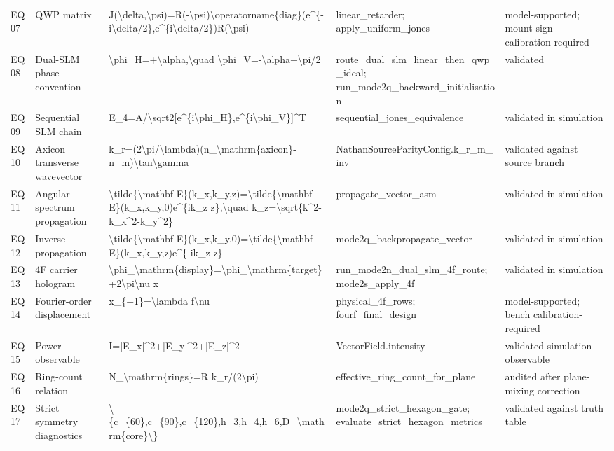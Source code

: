 \documentclass[11pt,a4paper]{report}
\begin{document}
\begin{longtable}{p{}p{}p{}p{}p{}}
EQ07 & QWP matrix & J(\textbackslash{}delta,\textbackslash{}psi)=R(-\textbackslash{}psi)\textbackslash{}operatorname\{diag\}(e\textasciicircum{}\{-i\textbackslash{}delta/2\},e\textasciicircum{}\{i\textbackslash{}delta/2\})R(\textbackslash{}psi) & linear\_retarder; apply\_uniform\_jones & model-supported; mount sign calibration-required\\
EQ08 & Dual-SLM phase convention & \textbackslash{}phi\_H=+\textbackslash{}alpha,\textbackslash{}quad \textbackslash{}phi\_V=-\textbackslash{}alpha+\textbackslash{}pi/2 & route\_dual\_slm\_linear\_then\_qwp\_ideal; run\_mode2q\_backward\_initialisation & validated\\
EQ09 & Sequential SLM chain & E\_4=A/\textbackslash{}sqrt2[e\textasciicircum{}\{i\textbackslash{}phi\_H\},e\textasciicircum{}\{i\textbackslash{}phi\_V\}]\textasciicircum{}T & sequential\_jones\_equivalence & validated in simulation\\
EQ10 & Axicon transverse wavevector & k\_r=(2\textbackslash{}pi/\textbackslash{}lambda)(n\_\textbackslash{}mathrm\{axicon\}-n\_m)\textbackslash{}tan\textbackslash{}gamma & NathanSourceParityConfig.k\_r\_m\_inv & validated against source branch\\
EQ11 & Angular spectrum propagation & \textbackslash{}tilde\{\textbackslash{}mathbf E\}(k\_x,k\_y,z)=\textbackslash{}tilde\{\textbackslash{}mathbf E\}(k\_x,k\_y,0)e\textasciicircum{}\{ik\_z z\},\textbackslash{}quad k\_z=\textbackslash{}sqrt\{k\textasciicircum{}2-k\_x\textasciicircum{}2-k\_y\textasciicircum{}2\} & propagate\_vector\_asm & validated in simulation\\
EQ12 & Inverse propagation & \textbackslash{}tilde\{\textbackslash{}mathbf E\}(k\_x,k\_y,0)=\textbackslash{}tilde\{\textbackslash{}mathbf E\}(k\_x,k\_y,z)e\textasciicircum{}\{-ik\_z z\} & mode2q\_backpropagate\_vector & validated in simulation\\
EQ13 & 4F carrier hologram & \textbackslash{}phi\_\textbackslash{}mathrm\{display\}=\textbackslash{}phi\_\textbackslash{}mathrm\{target\}+2\textbackslash{}pi\textbackslash{}nu x & run\_mode2n\_dual\_slm\_4f\_route; mode2s\_apply\_4f & validated in simulation\\
EQ14 & Fourier-order displacement & x\_\{+1\}=\textbackslash{}lambda f\textbackslash{}nu & physical\_4f\_rows; fourf\_final\_design & model-supported; bench calibration-required\\
EQ15 & Power observable & I=|E\_x|\textasciicircum{}2+|E\_y|\textasciicircum{}2+|E\_z|\textasciicircum{}2 & VectorField.intensity & validated simulation observable\\
EQ16 & Ring-count relation & N\_\textbackslash{}mathrm\{rings\}=R k\_r/(2\textbackslash{}pi) & effective\_ring\_count\_for\_plane & audited after plane-mixing correction\\
EQ17 & Strict symmetry diagnostics & \textbackslash{}\{c\_\{60\},c\_\{90\},c\_\{120\},h\_3,h\_4,h\_6,D\_\textbackslash{}mathrm\{core\}\textbackslash{}\} & mode2q\_strict\_hexagon\_gate; evaluate\_strict\_hexagon\_metrics & validated against truth table\\
\bottomrule
\end{longtable}
\end{document}
